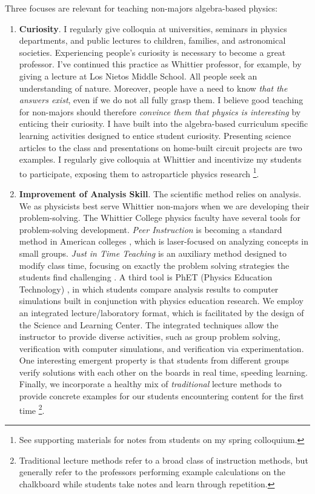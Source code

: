 \documentclass[../../main.tex]{subfiles}
\begin{document}
Three focuses are relevant for teaching non-majors algebra-based physics:
\begin{enumerate}
\item \textbf{Curiosity}.  I regularly give colloquia at universities, seminars in physics departments, and public lectures to children, families, and astronomical societies.  Experiencing people's curiosity is necessary to become a great professor.  I've continued this practice as Whittier professor, for example, by giving a lecture at Los Nietos Middle School.  All people seek an understanding of nature.  Moreover, people have a need to know \textit{that the answers exist}, even if we do not all fully grasp them.  I believe good teaching for non-majors should therefore \textit{convince them that physics is interesting} by enticing their curiosity.  I have built into the algebra-based curriculum specific learning activities designed to entice student curiosity.  Presenting science articles to the class and presentations on home-built circuit projects are two examples.  I regularly give colloquia at Whittier and incentivize my students to participate, exposing them to astroparticle physics research \footnote{See supporting materials for notes from students on my spring colloquium.}.

\item \textbf{Improvement of Analysis Skill}.  The scientific method relies on analysis.  We as physicists best serve Whittier non-majors when we are developing their problem-solving.  The Whittier College physics faculty have several tools for problem-solving development.  \textit{Peer Instruction} is becoming a standard method in American colleges \cite{mazur}, which is laser-focused on analyzing concepts in small groups.  \textit{Just in Time Teaching} is an auxiliary method designed to modify class time, focusing on exactly the problem solving strategies the students find challenging \cite{howpeoplelearn}.  A third tool is PhET (Physics Education Technology) \cite{phet}, in which students compare analysis results to computer simulations built in conjunction with physics education research.  We employ an integrated lecture/laboratory format, which is facilitated by the design of the Science and Learning Center.  The integrated techniques allow the instructor to provide diverse activities, such as group problem solving, verification with computer simulations, and verification via experimentation.  One interesting emergent property is that students from different groups verify solutions with each other on the boards in real time, speeding learning.  Finally, we incorporate a healthy mix of \textit{traditional} lecture methods to provide concrete examples for our students encountering content for the first time \footnote{Traditional lecture methods refer to a broad class of instruction methods, but generally refer to the professors performing example calculations on the chalkboard while students take notes and learn through repetition.}.


\end{enumerate}
\end{document}
